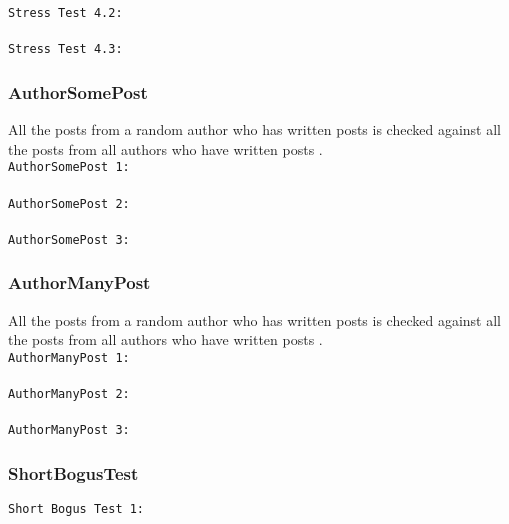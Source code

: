 \begin{description}
\texttt{Stress Test 4.2:}\\
\\

\texttt{Stress Test 4.3:}\\


\subsubsection{AuthorSomePost}
All the posts from a random author who has written  posts is checked against all the posts from all authors who have written  posts .\\  
\texttt{AuthorSomePost 1:}\\
\\

\texttt{AuthorSomePost 2:}\\
\\

\texttt{AuthorSomePost 3:}\\


\subsubsection{AuthorManyPost}
All the posts from a random author who has written  posts is checked against all the posts from all authors who have written  posts .\\  

\texttt{AuthorManyPost 1:}\\
\\

\texttt{AuthorManyPost 2:}\\
\\

\texttt{AuthorManyPost 3:}\\


\subsubsection{ShortBogusTest}
\texttt{Short Bogus Test 1:}\\
\\


\end{description}
